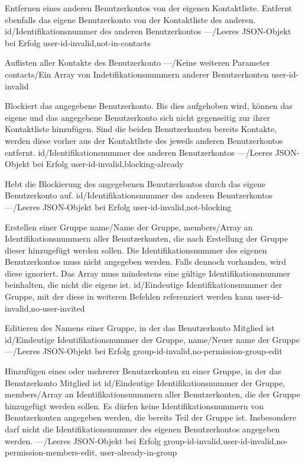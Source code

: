 \documentclass[parskip=full,11pt]{scrartcl}
\begin{document}
{Entfernen eines anderen Benutzerkontos von der eigenen Kontaktliste.
Entfernt ebenfalls das eigene Benutzerkonto von der Kontaktliste des anderen.}
{id/Identifikationsnummer des anderen Benutzerkontos}
{---/Leeres JSON-Objekt bei Erfolg}
{user-id-invalid,not-in-contacts}

{Auflisten aller Kontakte des Benutzerkonto}
{---/Keine weiteren Parameter}
{contacts/Ein Array von Indetifikationsnummern anderer Benutzerkonten}
{user-id-invalid}

{Blockiert das angegebene Benutzerkonto.
Bis dies aufgehoben wird, können das eigene und das angegebene
Benutzerkonto sich nicht gegenseitig zur ihrer Kontaktliste hinzufügen.
Sind die beiden Benutzerkonten bereits Kontakte, werden diese vorher aus der
Kontaktliste des jeweils anderen Benutzerkontos entfernt.}
{id/Identifikationsnummer des anderen Benutzerkontos}
{---/Leeres JSON-Objekt bei Erfolg}
{user-id-invalid,blocking-already}

{Hebt die Blockierung des angegebenen Benutzerkontos durch das eigene
Benutzerkonto auf.}
{id/Identifikationsnummer des anderen Benutzerkontos}
{---/Leeres JSON-Objekt bei Erfolg}
{user-id-invalid,not-blocking}

{Erstellen einer Gruppe}
{name/Name der Gruppe,
members/Array an Identifikationsnummern aller Benutzerkonten{,} die nach
Erstellung der Gruppe dieser hinzugefügt werden sollen.
Die Identifikationsnummer des eigenen Benutzerkontos muss nicht angegeben
werden.
Falls dennoch vorhanden{,} wird diese ignoriert.
Das Array muss mindestens eine gültige Identifikationsnummer beinhalten{,} die
nicht die eigene ist.}
{id/Eindeutige Identifikationsnummer der Gruppe{,} mit der diese in
weiteren Befehlen referenziert werden kann}
{user-id-invalid,no-user-invited}

{Editieren des Namens einer Gruppe, in der das Benutzerkonto Mitglied ist}
{id/Eindeutige Identifikationsnummer der Gruppe,
name/Neuer name der Gruppe}
{---/Leeres JSON-Objekt bei Erfolg}
{group-id-invalid,no-permission-group-edit}

{Hinzufügen eines oder mehrerer Benutzerkonten zu einer Gruppe, in der das
Benutzerkonto Mitglied ist}
{id/Eindeutige Identifikationsnummer der Gruppe,
members/Array an Identifikationsnummern aller Benutzerkonten{,} die der Gruppe
hinzugefügt werden sollen.
Es dürfen keine Identifikationsnummern von Benutzerkonten angegeben werden{,}
die bereits Teil der Gruppe ist.
Insbesondere darf nicht die Identifikationsnummer des eigenen Benutzerkontos
angegeben werden.}
{---/Leeres JSON-Objekt bei Erfolg}
{group-id-invalid,user-id-invalid,no-permission-members-edit,%
user-already-in-group}
\end{document}
